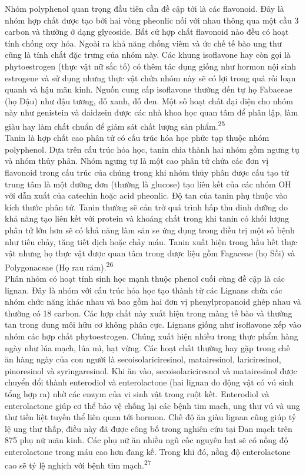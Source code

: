\documentclass[
  letterpaper,
  DIV=11,
  numbers=noendperiod]{scrartcl}
\begin{document}
Nhóm polyphenol quan trọng đầu tiên cần đề cập tới là các flavonoid. Đây
là nhóm hợp chất được tạo bởi hai vòng pheonlic nối với nhau thông qua
một cầu 3 carbon và thường ở dạng glycoside. Bất cứ hợp chất flavonoid
nào đều có hoạt tính chống oxy hóa. Ngoài ra khả năng chống viêm và ức
chế tế bào ung thư cũng là tính chất đặc trưng của nhóm này. Các khung
isoflavone hay còn gọi là phytoestrogen (thực vật nữ sắc tố) có thêm tác
dụng giống như hormon nội sinh estrogene và sử dụng nhưng thực vật chứa
nhóm này sẽ có lợi trong quá rối loạn quanh và hậu mãn kinh. Nguồn cung
cấp isoflavone thường đến tự họ Fabaceae (họ Đậu) như đậu tương, đỗ
xanh, đỗ đen. Một số hoạt chất đại diện cho nhóm này như genistein và
daidzein được các nhà khoa học quan tâm để phân lập, làm giàu hay làm
chất chuẩn để giám sát chất lượng sản phẩm.\textsuperscript{25}\\
Tanin là hợp chất cao phân tử có cấu trúc hóa học phức tạp thuộc nhóm
polyphenol. Dựa trên cấu trúc hóa học, tanin chia thành hai nhóm gồm
ngưng tụ và nhóm thủy phân. Nhóm ngưng tự là một cao phân tử chứa các
đơn vị flavonoid trong cấu trúc của chúng trong khi nhóm thủy phân được
cấu tạo từ trung tâm là một đường đơn (thường là glucose) tạo liên kết
của các nhóm OH với dẫn xuất của catechin hoặc acid pheonlic. Độ tan của
tanin phụ thuộc vào kích thước phân tử. Tanin thường sẽ cản trở quá
trình hấp thu dinh dưỡng do khả năng tạo liên kết với protein và khoáng
chất trong khi tanin có khối lượng phân tử lớn hơn sẽ có khả năng làm
săn se ứng dụng trong điều trị một số bệnh như tiêu chảy, tăng tiết dịch
hoặc chảy máu. Tanin xuất hiện trong hầu hết thực vật nhưng họ thực vật
được quan tâm trong dược liệu gồm Fagaceae (họ Sồi) và Polygonaceae (Họ
rau răm).\textsuperscript{26}\\
Phân nhóm có hoạt tính sinh học mạnh thuộc phenol cuối cùng đề cập là
các lignan. Đây là nhóm với cấu trúc hóa học tạo thành từ các Lignans
chứa các nhóm chức năng khác nhau và bao gồm hai đơn vị phenylpropanoid
ghép nhau và thường có 18 carbon. Các hợp chất này xuất hiện trong màng
tế bào và thường tan trong dung môi hữu cơ không phân cực. Lignans giống
như isoflavone xếp vào nhóm các hợp chất phytoestrogen. Chúng xuất hiện
nhiều trong thực phẩm hàng ngày như lúa mạch, lúa mì, hạt vừng. Các hoạt
chất thường hay gặp trong chế ăn hàng ngày của con người là
secoisolariciresinol, matairesinol, lariciresinol, pinoresinol và
syringaresinol. Khi ăn vào, secoisolariciresnol và matairesinol được
chuyển đổi thành enterodiol và enterolactone (hai lignan do động vật có
vú sinh tổng hợp ra) nhờ các enzym của vi sinh vật trong ruột kết.
Enterodiol và enterolactone giúp cơ thể bảo vệ chống lại các bệnh tim
mạch, ung thư vú và ung thư tiền liệt tuyến thể liên quan tới hormon.
Chế độ ăn giàu lignan cũng giúp tỷ lệ ung thư thấp, điều này đã được
công bố trong nghiên cứu tại Đan mạch trên 875 phụ nữ mãn kinh. Các phụ
nữ ăn nhiều ngũ cốc nguyên hạt sẽ có nồng độ enterolactone trong máu cao
hơn đang kế. Trong khi đó, nồng độ enterolactone cao sẽ tỷ lệ nghịch với
bệnh tim mạch.\textsuperscript{27}
\end{document}
